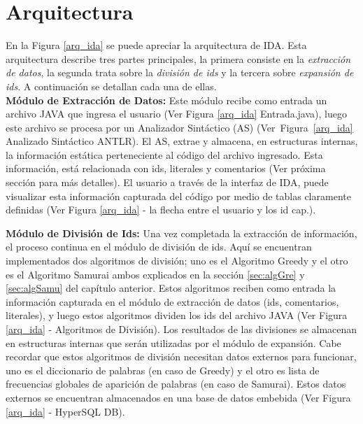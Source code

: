 \section{Arquitectura}


En la Figura \ref{arq_ida} se puede apreciar la arquitectura de IDA. Esta arquitectura describe tres partes principales, la primera consiste en la \textit{extracción de datos}, la segunda trata sobre la \textit{división de ids} y la tercera sobre \textit{expansión de ids}. A continuación se detallan cada una de ellas.\\

\textbf{Módulo de Extracción de Datos:} Este módulo recibe como entrada un archivo JAVA que ingresa el usuario (Ver Figura \ref{arq_ida} Entrada.java), luego este archivo se procesa por un Analizador Sintáctico (AS) (\mbox{Ver Figura \ref{arq_ida}} Analizado Sintáctico ANTLR). El AS, extrae y almacena, en estructuras internas, la información estática perteneciente al código del archivo ingresado. Esta información, está relacionada con ids, literales y comentarios (Ver próxima sección para más detalles). El usuario a través de la interfaz de IDA, puede visualizar esta información capturada del código por medio de tablas claramente definidas (Ver Figura \ref{arq_ida} - la flecha entre el usuario y los id cap.).

\textbf{Módulo de División de Ids:} Una vez completada la extracción de información, el proceso continua en el módulo de división de ids. Aquí se encuentran implementados dos algoritmos de división; uno es el Algoritmo Greedy y el otro es el Algoritmo Samurai ambos explicados en la sección \ref{sec:algGre} y \ref{sec:algSamu} del capítulo anterior. Estos algoritmos reciben como entrada la información capturada en el módulo de extracción de datos (ids, comentarios, literales), y luego estos algoritmos dividen los ids del archivo JAVA (Ver Figura \ref{arq_ida} - Algoritmos de División). Los resultados de las divisiones se almacenan en estructuras internas que serán utilizadas por el módulo de expansión. Cabe recordar que estos algoritmos de división necesitan datos externos para funcionar, uno es el diccionario de palabras (en caso de Greedy) y el otro es lista de frecuencias globales de aparición de palabras (en caso de Samurai). Estos datos externos se encuentran almacenados en una base de datos embebida (Ver Figura \ref{arq_ida} - HyperSQL DB).

